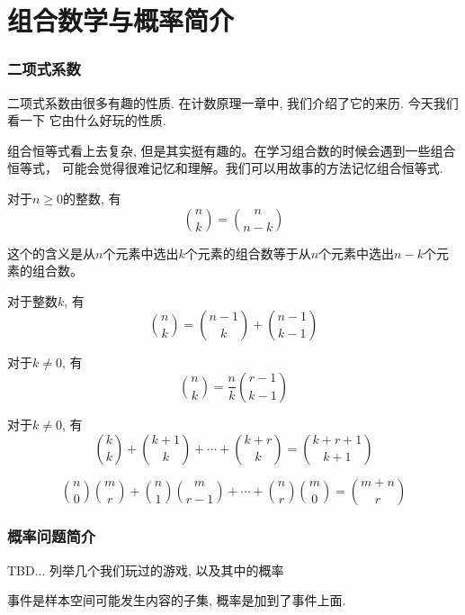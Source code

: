 \part{组合数学与概率简介}

\section{二项式系数}
二项式系数由很多有趣的性质. 在计数原理一章中, 我们介绍了它的来历. 今天我们看一下
它由什么好玩的性质. 

组合恒等式看上去复杂, 但是其实挺有趣的。在学习组合数的时候会遇到一些组合恒等式，
可能会觉得很难记忆和理解。我们可以用故事的方法记忆组合恒等式. 

\begin{theorem} 对于$n\geq 0$的整数, 有
    $$\binom nk = \binom {n}{n-k}$$
\end{theorem}

这个的含义是从$n$个元素中选出$k$个元素的组合数等于从$n$个元素中选出$n-k$个元素的组合数。

\begin{theorem}对于整数$k$, 有
    $$\binom nk = \binom {n-1}{k} + \binom {n-1}{k-1}$$
\end{theorem}

\begin{theorem} 对于$k\neq 0$, 有
    $$\binom nk = \frac nk {\binom {r-1}{k-1}}$$
\end{theorem}

\begin{theorem} 对于$k\neq 0$, 有
    $$\binom kk+\binom{k+1}k+\cdots+\binom{k+r}k=\binom{k+r+1}{k+1}$$
\end{theorem}

\begin{theorem}[Vandermonde卷积] 
    $$\binom n0 \binom mr+\binom{n}1\binom{m}{r-1}+\cdots+\binom nr\binom m0=\binom{m+n}{r}$$
\end{theorem}


\section{概率问题简介} 

 TBD... 列举几个我们玩过的游戏, 以及其中的概率

\begin{definition}
    事件是样本空间可能发生内容的子集, 概率是加到了事件上面. 
\end{definition}

